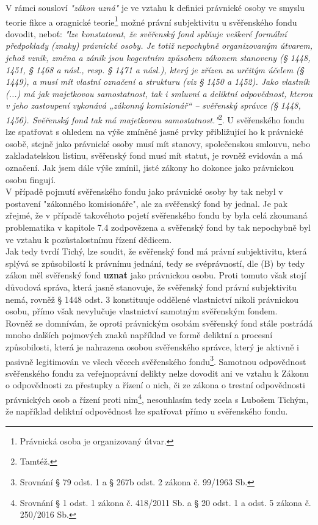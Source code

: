 \documentclass{article}
\begin{document}
V rámci sousloví \textit{"zákon uzná"} je ve vztahu k definici právnické osoby ve smyslu teorie fikce a oragnické teorie\footnote{Právnická osoba je organizovaný útvar.} možné právní subjektivitu u svěřenského fondu dovodit, neboť: \textit{"lze konstatovat, že svěřenský fond splňuje veškeré formální předpoklady (znaky) právnické osoby. Je totiž nepochybně organizovaným útvarem, jehož vznik, změna a zánik jsou kogentním způsobem zákonem stanoveny (§ 1448, 1451, § 1468 a násl., resp. § 1471 a násl.), který je zřízen za určitým účelem (§ 1449), a musí mít vlastní označení a strukturu (viz § 1450 a 1452). Jako vlastník (...) má jak majetkovou samostatnost, tak i smluvní a deliktní odpovědnost, kterou v jeho zastoupení vykonává „zákonný komisionář“ – svěřenský správce (§ 1448, 1456). Svěřenský fond tak má majetkovou samostatnost."}\footnote{Tamtéž.}. U svěřenského fondu lze spatřovat s ohledem na výše zmíněné jasné prvky přibližující ho k právnické osobě, stejně jako právnické osoby musí mít stanovy, společenskou smlouvu, nebo zakladatelskou listinu, svěřenský fond musí mít statut, je rovněž evidován a má označení. Jak jsem dále výše zmínil, jisté zákony ho dokonce jako právnickou osobu fingují.\\

V případě pojmutí svěřenského fondu jako právnické osoby by tak nebyl v postavení "zákonného komisionáře", ale za svěřenský fond by jednal. Je pak zřejmé, že v případě takovéhoto pojetí svěřenského fondu by byla celá zkoumaná problematika v kapitole 7.4 zodpovězena a svěřenský fond by tak nepochybně byl ve vztahu k pozůstalostnímu řízení dědicem.\\

Jak tedy tvrdí Tichý, lze soudit, že svěřenský fond má právní subjektivitu, která splývá se způsobilostí k právnímu jednání, tedy se svéprávností, dle (B) by tedy zákon měl svěřenský fond \textbf{uznat} jako právnickou osobu. Proti tomuto však stojí důvodová správa, která jasně stanovuje, že svěřenský fond právní subjektivitu nemá, rovněž § 1448 odst. 3 konstituuje oddělené vlastnictví nikoli právnickou osobu, přímo však nevylučuje vlastnictví samotným svěřenským fondem.\\

Rovněž se domnívám, že oproti právnickým osobám svěřenský fond stále postrádá mnoho dalších pojmových znaků například ve formě deliktní a procesní způsobilosti, která je nahrazena osobou svěřenského správce, který je aktivně i pasivně legitimován ve všech věcech svěřenského fondu\footnote{Srovnání § 79 odst. 1 a § 267b odst. 2 zákona č. 99/1963 Sb.}. Samotnou odpovědnost svěřenského fondu za veřejnoprávní delikty nelze dovodit ani ve vztahu k Zákonu o odpovědnosti za přestupky a řízení o nich, či ze zákona o trestní odpovědnosti právnických osob a řízení proti nim\footnote{Srovnání § 1 odst. 1 zákona č. 418/2011 Sb. a § 20 odst. 1 a odst. 5 zákona č. 250/2016 Sb.}, nesouhlasím tedy zcela s Lubošem Tichým, že například deliktní odpovědnost lze spatřovat přímo u svěřenského fondu.\\
\end{document}
